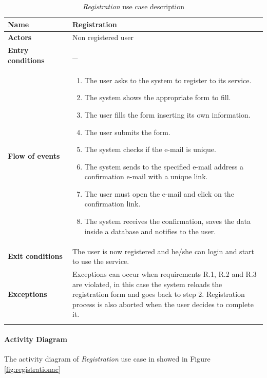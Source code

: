 \begin{longtable}{p{0.25\linewidth}p{0.75\linewidth}}
	\hline
	\textbf{Name} & \textbf{Registration} \\
	\hline
	\textbf{Actors} & Non registered user \\
	\hline
	\textbf{Entry conditions} & \_ \\
	\hline
	\textbf{Flow of events} & 
	\begin{enumerate}
		\item The user asks to the system to register to its service.
		\item The system shows the appropriate form to fill.
		\item The user fills the form inserting its own information.
		\item The user submits the form.
		\item The system checks if the e-mail is unique.
		\item The system sends to the specified e-mail address a confirmation e-mail with a unique link.
		\item The user must open the e-mail and click on the confirmation link.
		\item The system receives the confirmation, saves the data inside a database and notifies to the user.
	\end{enumerate}\\
	\hline
	\textbf{Exit conditions} & The user is now registered and he/she can login and start to use the service.\\
	\hline
	\textbf{Exceptions} & Exceptions can occur when requirements R.1, R.2 and R.3 are violated, in this case the system reloads the registration form and goes back to step 2. 
	Registration process is also aborted when the user decides to complete it. \\
	\hline
	\caption{\emph{Registration} use case description}
	\label{tab:registration}
\end{longtable}

\paragraph*{Activity Diagram\\}
The activity diagram of \emph{Registration} use case in showed in Figure \ref{fig:registrationac}

